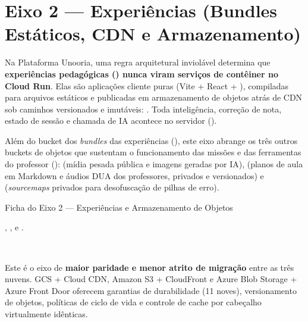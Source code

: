 \chapter{Eixo 2 --- Experiências (Bundles Estáticos, CDN e Armazenamento)}
\label{cap:eixo-experiencias}

Na Plataforma Unooria, uma regra arquitetural inviolável determina que
\textbf{experiências pedagógicas () nunca viram
serviços de contêiner no Cloud Run}. Elas são aplicações cliente puras (Vite +
React + ), compiladas para arquivos estáticos e publicadas em
armazenamento de objetos atrás de CDN sob caminhos versionados e imutáveis:
. Toda inteligência, correção de nota, estado de
sessão e chamada de IA acontece no servidor ().

Além do bucket dos \emph{bundles} das experiências (), este eixo
abrange os três outros buckets de objetos que sustentam o funcionamento das
missões e das ferramentas do professor ():  (mídia
pesada pública e imagens geradas por IA),  (planos de aula em
Markdown e áudios DUA dos professores, privados e versionados) e
 (\emph{sourcemaps} privados para desofuscação de pilhas de erro).

\begin{fichaeixo}{Ficha do Eixo 2 --- Experiências e Armazenamento de Objetos}
\begin{campos}
  \item[Arquivos de referência] , ,
     e .
  \item[Aderência por nuvem] \sgcp~\nativo \quad \saws~\nativo \quad
    \sazure~\nativo
  \item[Ponto focal] Este é o eixo de \textbf{maior paridade e menor atrito de
    migração} entre as três nuvens. GCS + Cloud CDN, Amazon S3 + CloudFront e
    Azure Blob Storage + Azure Front Door oferecem garantias de durabilidade
    (11 noves), versionamento de objetos, políticas de ciclo de vida e controle
    de cache por cabeçalho  virtualmente idênticas.
\end{campos}
\end{fichaeixo}

